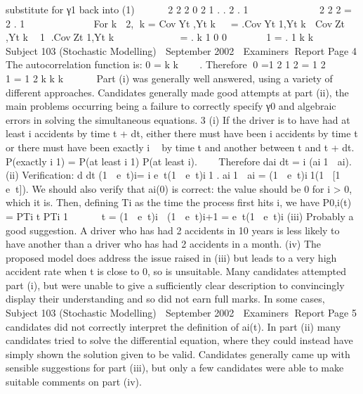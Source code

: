 substitute for γ1 back into (1)

 
 
2 2
2
0 2
1 .
. 2 .
1
  
    

2
2
2
= 2 .
1
  
       	
For k  2,
k = CovYt ,Yt k  
= .CovYt 1,Yt k  CovZt ,Yt k  1 .CovZt 1,Yt k      
   
= . k 1 0 0     
 1
= . 1 k
k

  
Subject 103 (Stochastic Modelling)  September 2002  Examiners Report
Page 4
The autocorrelation function is:
0
= k
k



. Therefore
0 =1
2
1 2
= 1
2
 


1
= 1 2 k
k k     
Part (i) was generally well answered, using a variety of different approaches. Candidates
generally made good attempts at part (ii), the main problems occurring being a failure to
correctly specify γ0 and algebraic errors in solving the simultaneous equations.
3 (i) If the driver is to have had at least i accidents by time t + dt, either there must
have been i accidents by time t or there must have been exactly i 	 by time t
and another between t and t + dt.
P(exactly i 1) = P(at least i 1) P(at least i).   
Therefore
dai
dt
= i
(ai1  ai).
(ii) Verification: d
dt
{(1  et)i}= i
et(1  et)i1 .
ai1  ai = (1  et)i1(1 [1  et]).
We should also verify that ai(0) is correct: the value should be 0 for i > 0,
which it is.
Then, defining Ti as the time the process first hits i, we have
P0,i(t) = P{Ti t} P{Ti 1 
    t} = (1  et)i  (1  et)i+1 = et(1 et)i
(iii)  Probably a good suggestion. A driver who has had 2 accidents in 10 years is
less likely to have another than a driver who has had 2 accidents in a month.
(iv) The proposed model does address the issue raised in (iii) but leads to a very
high accident rate when t is close to 0, so is unsuitable.
Many candidates attempted part (i), but were unable to give a sufficiently clear description to
convincingly display their understanding and so did not earn full marks. In some cases,
Subject 103 (Stochastic Modelling)  September 2002  Examiners Report
Page 5
candidates did not correctly interpret the definition of ai(t). In part (ii) many candidates tried
to solve the differential equation, where they could instead have simply shown the solution
given to be valid. Candidates generally came up with sensible suggestions for part (iii), but
only a few candidates were able to make suitable comments on part (iv).

